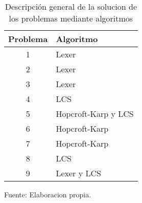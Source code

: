 \begin{table}[H]
\centering
\begin{tabular}{|c||l|}
\hline
Problema & Algoritmo \\ \hline
1 & Lexer \\ \hline
2 & Lexer \\ \hline
3 & Lexer \\ \hline
4 & LCS \\ \hline
5 & Hopcroft-Karp y LCS \\ \hline
6 & Hopcroft-Karp \\ \hline
7 & Hopcroft-Karp \\ \hline
8 & LCS \\ \hline
9 & Lexer y LCS \\ \hline
\end{tabular}
\caption{Descripción general de la solucion de los problemas mediante algoritmos}
Fuente: Elaboracion propia.
\label{algorithms_problems}
\end{table}
